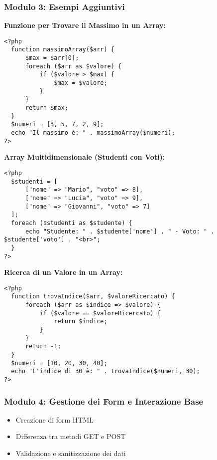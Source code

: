 \documentclass{beamer}
\begin{document}
\begin{frame}[fragile]
\frametitle{Modulo 3: Esempi Aggiuntivi}
\textbf{Funzione per Trovare il Massimo in un Array:}
\begin{lstlisting}
<?php
  function massimoArray($arr) {
      $max = $arr[0];
      foreach ($arr as $valore) {
          if ($valore > $max) {
              $max = $valore;
          }
      }
      return $max;
  }
  $numeri = [3, 5, 7, 2, 9];
  echo "Il massimo è: " . massimoArray($numeri);
?>
\end{lstlisting}
\vspace{0.5em}
\textbf{Array Multidimensionale (Studenti con Voti):}
\begin{lstlisting}
<?php
  $studenti = [
      ["nome" => "Mario", "voto" => 8],
      ["nome" => "Lucia", "voto" => 9],
      ["nome" => "Giovanni", "voto" => 7]
  ];
  foreach ($studenti as $studente) {
      echo "Studente: " . $studente['nome'] . " - Voto: " . $studente['voto'] . "<br>";
  }
?>
\end{lstlisting}
\vspace{0.5em}
\textbf{Ricerca di un Valore in un Array:}
\begin{lstlisting}
<?php
  function trovaIndice($arr, $valoreRicercato) {
      foreach ($arr as $indice => $valore) {
          if ($valore == $valoreRicercato) {
              return $indice;
          }
      }
      return -1;
  }
  $numeri = [10, 20, 30, 40];
  echo "L'indice di 30 è: " . trovaIndice($numeri, 30);
?>
\end{lstlisting}
\end{frame}


\begin{frame}
\frametitle{Modulo 4: Gestione dei Form e Interazione Base}
\begin{itemize}
    \item Creazione di form HTML
    \item Differenza tra metodi GET e POST
    \item Validazione e sanitizzazione dei dati
\end{itemize}
\end{frame}
\end{document}
